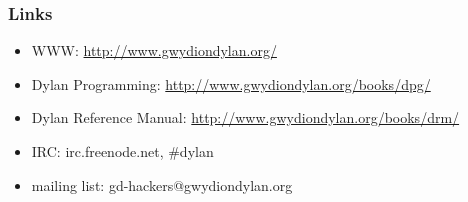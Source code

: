 \documentclass[compress]{beamer}
\begin{document}
\begin{frame}
  \frametitle{Links}
  \begin{itemize}
  \item WWW: \url{http://www.gwydiondylan.org/}
  \item Dylan Programming: \url{http://www.gwydiondylan.org/books/dpg/}
  \item Dylan Reference Manual: \url{http://www.gwydiondylan.org/books/drm/}
  \item IRC: irc.freenode.net, \#dylan
  \item mailing list: gd-hackers@gwydiondylan.org
  \end{itemize}
\end{frame}
\end{document}
